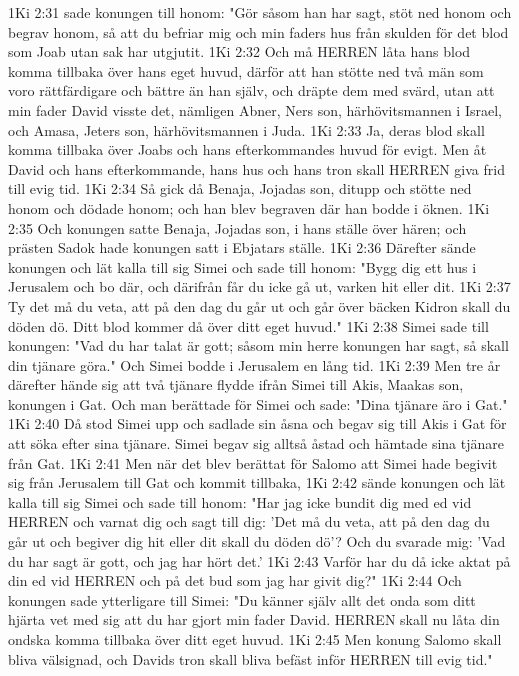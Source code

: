 1Ki 2:31  sade konungen till honom: "Gör såsom han har sagt, stöt ned honom och begrav honom, så att du befriar mig och min faders hus från skulden för det blod som Joab utan sak har utgjutit.
1Ki 2:32  Och må HERREN låta hans blod komma tillbaka över hans eget huvud, därför att han stötte ned två män som voro rättfärdigare och bättre än han själv, och dräpte dem med svärd, utan att min fader David visste det, nämligen Abner, Ners son, härhövitsmannen i Israel, och Amasa, Jeters son, härhövitsmannen i Juda.
1Ki 2:33  Ja, deras blod skall komma tillbaka över Joabs och hans efterkommandes huvud för evigt. Men åt David och hans efterkommande, hans hus och hans tron skall HERREN giva frid till evig tid.
1Ki 2:34  Så gick då Benaja, Jojadas son, ditupp och stötte ned honom och dödade honom; och han blev begraven där han bodde i öknen.
1Ki 2:35  Och konungen satte Benaja, Jojadas son, i hans ställe över hären; och prästen Sadok hade konungen satt i Ebjatars ställe.
1Ki 2:36  Därefter sände konungen och lät kalla till sig Simei och sade till honom: "Bygg dig ett hus i Jerusalem och bo där, och därifrån får du icke gå ut, varken hit eller dit.
1Ki 2:37  Ty det må du veta, att på den dag du går ut och går över bäcken Kidron skall du döden dö. Ditt blod kommer då över ditt eget huvud."
1Ki 2:38  Simei sade till konungen: "Vad du har talat är gott; såsom min herre konungen har sagt, så skall din tjänare göra." Och Simei bodde i Jerusalem en lång tid.
1Ki 2:39  Men tre år därefter hände sig att två tjänare flydde ifrån Simei till Akis, Maakas son, konungen i Gat. Och man berättade för Simei och sade: "Dina tjänare äro i Gat."
1Ki 2:40  Då stod Simei upp och sadlade sin åsna och begav sig till Akis i Gat för att söka efter sina tjänare. Simei begav sig alltså åstad och hämtade sina tjänare från Gat.
1Ki 2:41  Men när det blev berättat för Salomo att Simei hade begivit sig från Jerusalem till Gat och kommit tillbaka,
1Ki 2:42  sände konungen och lät kalla till sig Simei och sade till honom: "Har jag icke bundit dig med ed vid HERREN och varnat dig och sagt till dig: 'Det må du veta, att på den dag du går ut och begiver dig hit eller dit skall du döden dö'? Och du svarade mig: 'Vad du har sagt är gott, och jag har hört det.'
1Ki 2:43  Varför har du då icke aktat på din ed vid HERREN och på det bud som jag har givit dig?"
1Ki 2:44  Och konungen sade ytterligare till Simei: "Du känner själv allt det onda som ditt hjärta vet med sig att du har gjort min fader David. HERREN skall nu låta din ondska komma tillbaka över ditt eget huvud.
1Ki 2:45  Men konung Salomo skall bliva välsignad, och Davids tron skall bliva befäst inför HERREN till evig tid."
